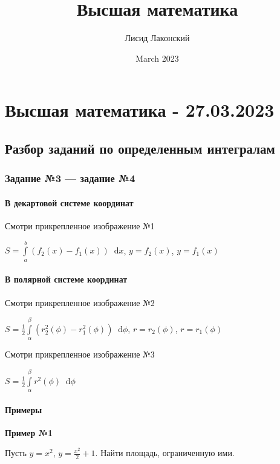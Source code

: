 \documentclass{article}
\title{Высшая математика}
\author{Лисид Лаконский}
\date{March 2023}
\newcommand*\diff{\mathop{}\!\mathrm{d}}
\begin{document}
\raggedright

\maketitle

\tableofcontents
\pagebreak

\section{Высшая математика - 27.03.2023}

\subsection{Разбор заданий по определенным интегралам}

\subsubsection{Задание №3 — задание №4}

\paragraph{В декартовой системе координат}

Смотри прикрепленное изображение №1

$S = \int\limits_{a}^{b} (f_2(x) - f_1(x)) \diff x$, $y = f_2(x)$, $y = f_1(x)$

\paragraph{В полярной системе координат}

Смотри прикрепленное изображение №2

$S = \frac{1}{2} \int\limits_{\alpha}^{\beta} (r_2^2(\phi) - r_1^2(\phi)) \diff \phi$, $r = r_2(\phi)$, $r = r_1(\phi)$

\hfill

Смотри прикрепленное изображение №3

$S = \frac{1}{2} \int\limits_{\alpha}^{\beta} r^2(\phi) \diff \phi$

\paragraph{Примеры}

\textbf{Пример №1}

Пусть $y = x^2$, $y = \frac{x^2}{2} + 1$. Найти площадь, ограниченную ими.
\end{document}
